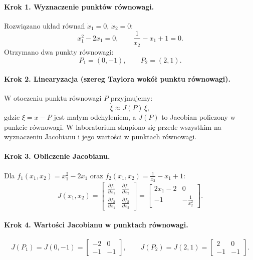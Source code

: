 \documentclass[12pt,a4paper]{article}
\begin{document}
\paragraph{Krok 1. Wyznaczenie punkt\'ow r\'ownowagi.}
Rozwi\k{a}zano uk\l{}ad r\'owna\'n $\dot{x}_1=0$, $\dot{x}_2=0$:
\begin{equation}
    x_1^2-2x_1=0,\qquad \frac{1}{x_2}-x_1+1=0.
\end{equation}
Otrzymano dwa punkty r\'ownowagi:
\begin{equation}
    P_1=(0,-1),\qquad P_2=(2,1).
\end{equation}

\paragraph{Krok 2. Linearyzacja (szereg Taylora wok\'o\l{} punktu r\'ownowagi).}
W otoczeniu punktu r\'ownowagi $P$ przyjmujemy:
\begin{equation}
    \dot{\xi} \approx J(P)\,\xi,
\end{equation}
gdzie $\xi=x-P$ jest ma\l{}ym odchyleniem, a $J(P)$ to Jacobian policzony w punkcie r\'ownowagi.
W laboratorium skupiono si\k{e} przede wszystkim na wyznaczeniu Jacobianu i jego warto\'sci w punktach r\'ownowagi.

\paragraph{Krok 3. Obliczenie Jacobianu.}
Dla $f_1(x_1,x_2)=x_1^2-2x_1$ oraz $f_2(x_1,x_2)=\frac{1}{x_2}-x_1+1$:
\begin{equation}
    J(x_1,x_2)=
    \begin{bmatrix}
        \frac{\partial f_1}{\partial x_1} & \frac{\partial f_1}{\partial x_2}\\
        \frac{\partial f_2}{\partial x_1} & \frac{\partial f_2}{\partial x_2}
    \end{bmatrix}
    =
    \begin{bmatrix}
        2x_1-2 & 0\\
        -1 & -\frac{1}{x_2^2}
    \end{bmatrix}.
\end{equation}

\paragraph{Krok 4. Warto\'sci Jacobianu w punktach r\'ownowagi.}
\begin{equation}
    J(P_1)=J(0,-1)=
    \begin{bmatrix}
        -2 & 0\\
        -1 & -1
    \end{bmatrix},
    \qquad
    J(P_2)=J(2,1)=
    \begin{bmatrix}
        2 & 0\\
        -1 & -1
    \end{bmatrix}.
\end{equation}
\end{document}
